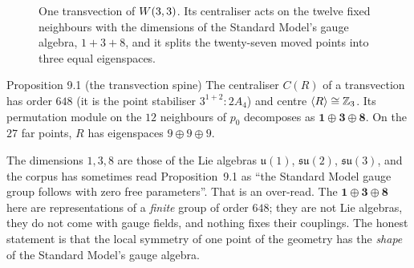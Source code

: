 \begin{figure}[htbp]
\centering
{}
\caption{One transvection of $W(3,3)$. Its centraliser acts on the twelve fixed neighbours
with the dimensions of the Standard Model's gauge algebra, $1+3+8$, and it splits the
twenty-seven moved points into three equal eigenspaces.}
\label{fig:transvection}
\end{figure}

\begin{result}{Proposition 9.1 (the transvection spine) \hfill \tierC}
The centraliser $C(R)$ of a transvection has order $648$ (it is the point stabiliser
$3^{1+2}{:}2A_4$) and centre $\langle R\rangle\cong\mathbb{Z}_3$. Its permutation module on the $12$
neighbours of $p_0$ decomposes as $\mathbf1\oplus\mathbf3\oplus\mathbf8$. On the $27$ far
points, $R$ has eigenspaces $9\oplus9\oplus9$.
\end{result}

\begin{boundary}
The dimensions $1,3,8$ are those of the Lie algebras $\mathfrak u(1)$, $\mathfrak{su}(2)$,
$\mathfrak{su}(3)$, and the corpus has sometimes read Proposition~9.1 as ``the Standard
Model gauge group follows with zero free parameters''. That is an over-read. The
$\mathbf1\oplus\mathbf3\oplus\mathbf8$ here are representations of a \emph{finite} group of
order $648$; they are not Lie algebras, they do not come with gauge fields, and nothing
fixes their couplings. The honest statement is that the local symmetry of one point of the
geometry has the \emph{shape} of the Standard Model's gauge algebra. \tierB
\end{boundary}

